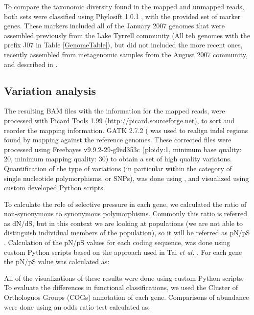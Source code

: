 To compare the taxonomic diversity found in the mapped and unmapped reads, both sets were classified using Phylosift 1.0.1 \cite{Darling:2014ej}, with the provided set of marker genes. These markers included all of the January 2007 genomes that were assembled previously from the Lake Tyrrell community \cite{Narasingarao:2012kp,Podell:2013kx} (All teh genomes with the prefix J07 in Table \ref{GenomeTable}), but did not included the more recent ones, recently assembled from metagenomic samples from the August 2007 community, and described in \cite{Podell:2013fp}.

\subsection{Variation analysis}

The resulting BAM files with the information for the mapped reads, were processed with Picard Tools 1.99 (\url{http://picard.sourceforge.net}), to sort and reorder the mapping information. GATK 2.7.2 (\cite{DePristo:2011fo} was used to realign indel regions found by mapping against the reference genomes. These corrected files were processed using Freebayes v9.9.2-29-g9ed353c \cite{Garrison:2012wb} (ploidy:1, minimum base quality: 20, minimum mapping quality: 30) to obtain a set of high quality variatons. Quantification of the type of variations (in particular within the category of single nucleotide polymorphisms, or SNPs), was done using \cite{Cingolani:2012cz}, and visualized using custom developed Python scripts. 

To calculate the role of selective pressure in each gene, we calculated the ratio of non-synonymous to synonymous polymorphisms. Commonly this ratio is referred as dN/dS, but in this context we are looking at populations (we are not able to distinguish individual members of the population), so it will be referred as pN/pS \cite{Schloissnig:2012hx}. Calculation of the pN/pS values for each coding sequence, was done using custom Python scripts based on the approach used in Tai \textit{et al.} \cite{Tai:2011jo}. For each gene the pN/pS value was calculated as:

\begin{center}
\end{center}

All of the visualizations of these results were done using custom Python scripts. To evaluate the differences in functional classifications, we used the Cluster of Orthologuos Groups (COGs) \cite{Tatusov:2003fk} annotation of each gene. Comparisons of abundance were done using an odds ratio test calculated as:

